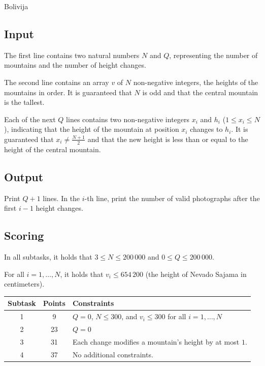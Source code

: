 \begin{statement}[
  problempoints=100,
  timelimit=2 seconds,
  memorylimit=512 MiB,
]{Bolivija}
\subsection*{Input}

The first line contains two natural numbers $N$ and $Q$, representing 
the number of mountains and the number of height changes.

The second line contains an array $v$ of $N$ non-negative integers, 
the heights of the mountains in order.  
It is guaranteed that $N$ is odd and that the central mountain is the tallest.

Each of the next $Q$ lines contains two non-negative integers $x_i$ and $h_i$ ($1 \leq x_i \leq N$), 
indicating that the height of the mountain at position $x_i$ changes to $h_i$.  
It is guaranteed that $x_i \neq \frac{N+1}{2}$ and that the new height is less than or equal to 
the height of the central mountain.

\subsection*{Output}

Print $Q + 1$ lines.  
In the $i$-th line, print the number of valid photographs after the first $i-1$ height changes.

\subsection*{Scoring}

In all subtasks, it holds that $3 \leq N \leq 200\,000$ and $0 \leq Q \leq 200\,000$.

For all $i = 1, \dots, N$, it holds that $v_i \leq 654\,200$ 
(the height of Nevado Sajama in centimeters).

{\renewcommand{\arraystretch}{1.4}
  \setlength{\tabcolsep}{6pt}
  \begin{tabular}{ccl}
   Subtask & Points & Constraints \\ \midrule
    1 & 9 & $Q = 0$, $N \leq 300$, and $v_i \leq 300$ for all $i = 1, \dots, N$ \\
    2 & 23 & $Q = 0$ \\
    3 & 31 & Each change modifies a mountain's height by at most $1$. \\
    4 & 37 & No additional constraints. \\
\end{tabular}}


\end{statement}
